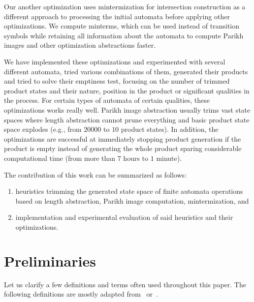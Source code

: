 
Our another optimization uses mintermization for intersection construction as a different approach to processing the initial automata before applying other optimizations. We compute minterms, which can be used instead of transition symbols while retaining all information about the automata to compute Parikh images and other optimization abstractions faster.


We have implemented these optimizations and experimented with several different automata, tried various combinations of them, generated their products and tried to solve their emptiness test, focusing on the number of trimmed product states and their nature, position in the product or significant qualities in the process. For certain types of automata of certain qualities, these optimizations works really well. Parikh image abstraction usually trims vast state spaces where length abstraction cannot prune everything and basic product state space explodes (e.g., from $20000$ to $10$ product states). In addition, the optimizations are successful at immediately stopping product generation if the product is empty instead of generating the whole product sparing considerable computational time (from more than $7$ hours to $1$ minute).

The contribution of this work can be summarized as follows:
\begin{enumerate}
    \item heuristics trimming the generated state space of finite automata operations based on length abstraction, Parikh image computation, mintermization, and
    \item implementation and experimental evaluation of said heuristics and their optimizations.
\end{enumerate}


\chapter{Preliminaries}

Let us clarify a few definitions and terms often used throughout this paper. The following definitions are mostly adapted from~\cite{Esparza} or~\cite{Sipser}.

